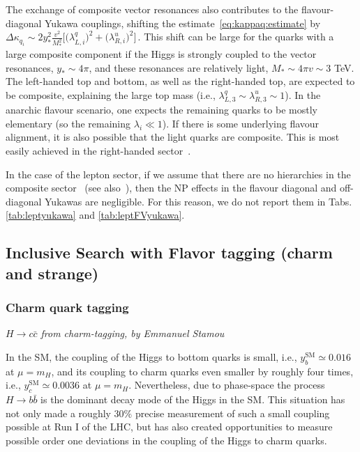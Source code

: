 \documentclass[../report.tex]{subfiles}
\begin{document}
The exchange of composite vector resonances also contributes to the
flavour-diagonal Yukawa couplings, shifting the
estimate~\eqref{eq:kappaq:estimate} by 
$\Delta \kappa_{q_i}\sim 2 y_*^2 \frac{v^2}{M_*^2}
\Big[\big(\lambda_{L,i}^q\big)^2+ \big(\lambda_{R,i}^u\big)^2\Big] \,$.
This shift can be large for the quarks with a large composite
component if the Higgs is strongly coupled to the vector resonances,
$y_*\sim 4\pi$, and these resonances are relatively light, $M_*\sim
4\pi v\sim 3$ TeV. The left-handed top and bottom, as well as the
right-handed top, are expected to be composite, explaining the large
top mass (i.e., $\lambda_{L,3}^q\sim \lambda_{R,3}^u\sim 1$). In the
anarchic flavour scenario, one expects the remaining quarks to be
mostly elementary (so the remaining $\lambda_i\ll 1$).  
If there is some underlying flavour alignment, it is also possible that
the light quarks are composite. This is most easily achieved in the
right-handed sector~\cite{Redi:2011zi, Redi:2012uj,
  Delaunay:2013iia}.

In the case of the lepton sector, if we assume that there are no
hierarchies in the composite sector~\cite{Redi:2013pga} (see also~\cite{Csaki:2008qq,delAguila:2010vg,Hagedorn:2011un,Hagedorn:2011pw}), then the NP
effects in the flavour diagonal and off-diagonal Yukawas are
negligible. For this reason, we do not report them in Tabs. \ref{tab:leptyukawa} and \ref{tab:leptFVyukawa}.




\subsection{Inclusive Search with Flavor tagging (charm and strange)}


\subsubsection{Charm quark tagging}

\begin{center}{\emph{$H \rightarrow c \bar{c}$ from charm-tagging, by Emmanuel Stamou}} \end{center}

In the SM, the coupling of the Higgs to bottom quarks is small, i.e.,
$y_b^{\text{SM}}\simeq 0.016$ at $\mu=m_H$, and 
its coupling to charm quarks even smaller by roughly four times,
i.e., $y_c^{\text{SM}}\simeq 0.0036$ at $\mu=m_H$.
Nevertheless, due to phase-space the process $H\to b\bar b$ is the dominant 
decay mode of the Higgs in the SM.
This situation has not only made a roughly $30\%$ precise measurement of such 
a small coupling possible at Run I of the LHC, but has also created 
opportunities to measure possible order one deviations in the 
coupling of the Higgs to charm quarks.
\end{document}
